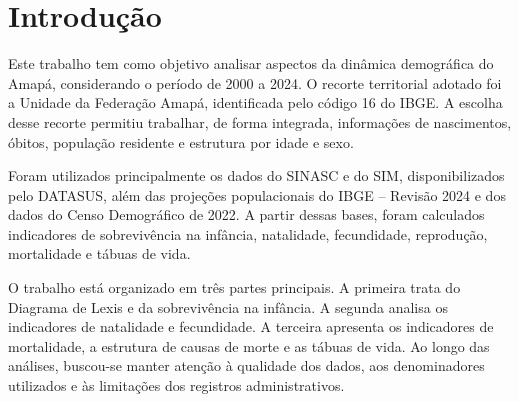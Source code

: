 \section{Introdução}

Este trabalho tem como objetivo analisar aspectos da dinâmica demográfica do Amapá, considerando o período de 2000 a 2024. O recorte territorial adotado foi a Unidade da Federação Amapá, identificada pelo código 16 do IBGE. A escolha desse recorte permitiu trabalhar, de forma integrada, informações de nascimentos, óbitos, população residente e estrutura por idade e sexo.

Foram utilizados principalmente os dados do SINASC e do SIM, disponibilizados pelo DATASUS, além das projeções populacionais do IBGE -- Revisão 2024 e dos dados do Censo Demográfico de 2022. A partir dessas bases, foram calculados indicadores de sobrevivência na infância, natalidade, fecundidade, reprodução, mortalidade e tábuas de vida.

O trabalho está organizado em três partes principais. A primeira trata do Diagrama de Lexis e da sobrevivência na infância. A segunda analisa os indicadores de natalidade e fecundidade. A terceira apresenta os indicadores de mortalidade, a estrutura de causas de morte e as tábuas de vida. Ao longo das análises, buscou-se manter atenção à qualidade dos dados, aos denominadores utilizados e às limitações dos registros administrativos.
